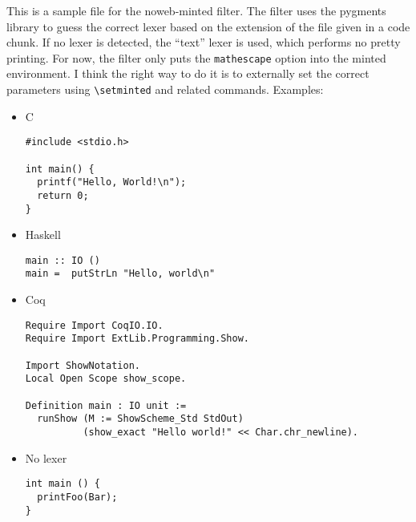 \documentclass{article}%
\begin{document}
This is a sample file for the {\Tt{}noweb-minted\nwendquote} filter. The filter uses
the pygments library to guess the correct lexer based on the extension
of the file given in a code chunk. If no lexer is detected, the
``text'' lexer is used, which performs no pretty printing. For now,
the filter only puts the {\tt mathescape} option into the minted
environment. I think the right way to do it is to externally set the
correct parameters using {\tt \textbackslash{setminted}} and related
commands. Examples:

\begin{itemize}
\item C

\endmoddef\nwstartdeflinemarkup\nwenddeflinemarkup
\begin{verbatim}
#include <stdio.h>

int main() {
  printf("Hello, World!\n");
  return 0;
}

\end{verbatim}
\nwdocspar

\item Haskell

\nwenddocs{}\endmoddef\nwstartdeflinemarkup\nwenddeflinemarkup
\begin{verbatim}
main :: IO ()
main =  putStrLn "Hello, world\n"

\end{verbatim}
\nwdocspar

\item Coq

\nwenddocs{}\endmoddef\nwstartdeflinemarkup\nwenddeflinemarkup
\begin{verbatim}
Require Import CoqIO.IO.
Require Import ExtLib.Programming.Show.

Import ShowNotation.
Local Open Scope show_scope.

Definition main : IO unit :=
  runShow (M := ShowScheme_Std StdOut)
          (show_exact "Hello world!" << Char.chr_newline).

\end{verbatim}
\nwdocspar

\item No lexer

\nwenddocs{}\endmoddef\nwstartdeflinemarkup\nwenddeflinemarkup
\begin{verbatim}
int main () {
  printFoo(Bar);
}

\end{verbatim}
\nwdocspar

\end{itemize}
\end{document}

